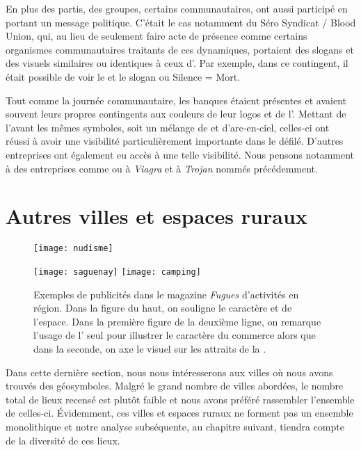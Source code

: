 En plus des partis, des groupes, certains communautaires, ont aussi participé en portant un message politique.
C'était le cas notamment du Séro Syndicat / Blood Union, qui, au lieu de seulement faire acte de présence comme certains organismes communautaires traitants de ces dynamiques, portaient des slogans et des visuels similaires ou identiques à ceux d’.
Par exemple, dans ce contingent, il était possible de voir le  et le slogan  ou Silence = Mort.

Tout comme la journée communautaire, les banques étaient présentes et avaient souvent leurs propres contingents aux couleurs de leur logos et de l'.
Mettant de l'avant les mêmes symboles, soit un mélange de  et d'arc-en-ciel, celles-ci ont réussi à avoir une visibilité particulièrement importante dans le défilé.
D'autres entreprises ont également eu accès à une telle visibilité.
Nous pensons notamment à des entreprises comme  ou à \emph{Viagra} et à \emph{Trojan} nommés précédemment.

\section{Autres villes et espaces ruraux}
\label{subsec:autresvilles}

\begin{figure}[ht!]
  \centering
  {\texttt{[image: nudisme]}}

  {\texttt{[image: saguenay]}}
  {\texttt{[image: camping]}}
  \caption[Événements en région]{Exemples de publicités dans le magazine \emph{Fugues} d'activités en région. Dans la figure du haut, on souligne le caractère  et  de l'espace. Dans la première figure de la deuxième ligne, on remarque l'usage de l' seul pour illustrer le caractère \lgbt{} du commerce alors que dans la seconde, on axe le visuel sur les attraits de la .}\label{figs:pubsregions}
\end{figure}

Dans cette dernière section, nous nous intéresserons aux villes où nous avons trouvés des géosymboles.
Malgré le grand nombre de villes abordées, le nombre total de lieux \lgbt{} recensé est plutôt faible et nous avons préféré rassembler l'ensemble de celles-ci.
Évidemment, ces villes et espaces ruraux ne forment pas un ensemble monolithique et notre analyse subséquente, au chapitre suivant, tiendra compte de la diversité de ces lieux.

